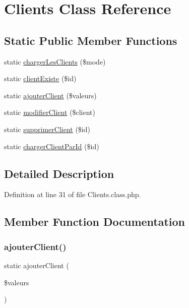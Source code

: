 \hypertarget{class_clients}{}\section{Clients Class Reference}
\label{class_clients}
\subsection*{Static Public Member Functions}
\begin{DoxyCompactItemize}
\item 
static \hyperlink{class_clients_a2b12a9858fa98f0e4ac82d61e964d6cf}{charger\+Les\+Clients} (\$mode)
\item 
static \hyperlink{class_clients_ac60a199f04ffa45e77b9b5a8d71f3cd5}{client\+Existe} (\$id)
\item 
static \hyperlink{class_clients_a68ed606ba25be99fda3c04bc89a9af1f}{ajouter\+Client} (\$valeurs)
\item 
static \hyperlink{class_clients_a17b60c983ed7423a2b4fb6d1bf6ee5d8}{modifier\+Client} (\$client)
\item 
static \hyperlink{class_clients_a3e4d31ae69a65522e3a811adfb7b4992}{supprimer\+Client} (\$id)
\item 
static \hyperlink{class_clients_a812b47f6e12cbe4ab79a0ba6a953c2d4}{charger\+Client\+Par\+Id} (\$id)
\end{DoxyCompactItemize}


\subsection{Detailed Description}


Definition at line 31 of file Clients.\+class.\+php.



\subsection{Member Function Documentation}
\mbox{\label{class_clients_a68ed606ba25be99fda3c04bc89a9af1f}} 
\subsubsection{\texorpdfstring{ajouter\+Client()}{ajouterClient()}}
{\footnotesize\ttfamily static ajouter\+Client (\begin{DoxyParamCaption}\item[{}]{\$valeurs }\end{DoxyParamCaption})\hspace{0.3cm}{\ttfamily [static]}}

